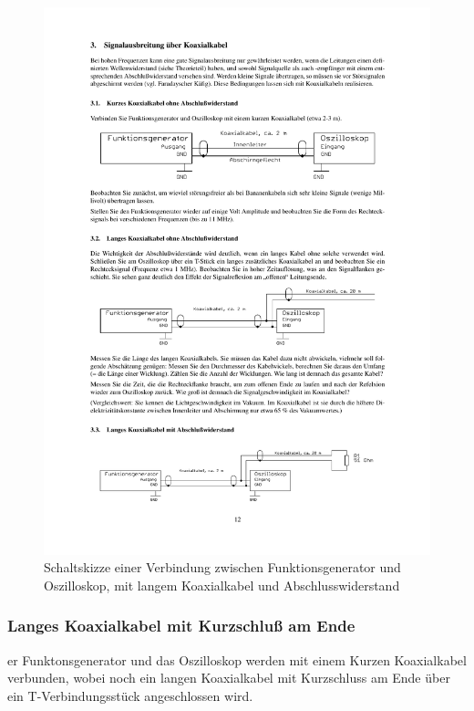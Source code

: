 \documentclass[12pt,a4paper]{article}
\begin{document}
\begin{figure}[H] 
  \centering
    \includegraphics[trim = 10mm 25mm 10mm 235mm, clip, scale = 1]{3-3_3.pdf}
  	\caption[Schaltskizze einer Verbindung zwischen Funktionsgenerator und Oszilloskop, mit langem Koaxialkabel und Abschlusswiderstand]{Schaltskizze einer Verbindung zwischen Funktionsgenerator und Oszilloskop, mit langem Koaxialkabel und Abschlusswiderstand\footnotemark}
  \label{fig:3.3}
\end{figure}

\subsubsection{Langes Koaxialkabel mit Kurzschluß am Ende}

er Funktonsgenerator und das Oszilloskop werden mit einem Kurzen Koaxialkabel verbunden, wobei noch ein langen Koaxialkabel mit Kurzschluss am Ende über ein T-Verbindungsstück angeschlossen wird.
\end{document}
